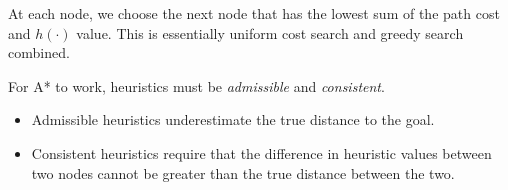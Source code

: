 \begin{parts}
\begin{solution}[1in]
At each node, we choose the next node that has the lowest sum of the path cost
and $h(\cdot)$ value. This is essentially uniform cost search and greedy search
combined.

For A* to work, heuristics must be \emph{admissible} and \emph{consistent}.

\begin{itemize}
\item Admissible heuristics underestimate the true distance to the goal.
\item Consistent heuristics require that the difference in heuristic values
between two nodes cannot be greater than the true distance between the two.
\end{itemize}
\end{solution}
\end{parts}
